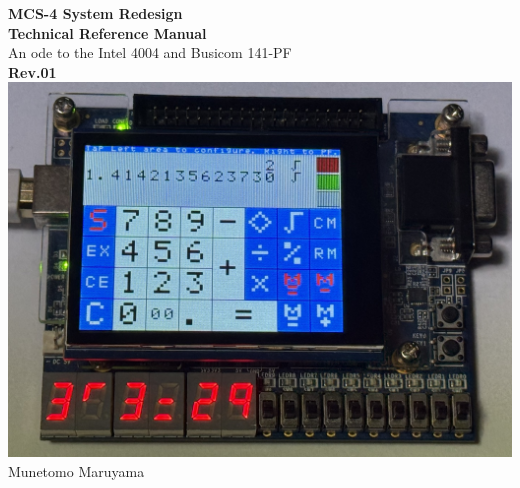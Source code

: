 \begin{titlepage}
    \begin{center}
        \vspace*{3cm}
        {\Huge \textbf{MCS-4 System Redesign}}\\[1cm]
        {\Huge \textbf{Technical Reference Manual}}\\[2cm]
        {\Large{An ode to the Intel 4004 and Busicom 141-PF}}\\[2cm]
        {\LARGE \textbf{Rev.01}}\\[5cm]
        \includegraphics[width=0.5\columnwidth]{./Figure/141PFonFPGA.jpg}\\[2cm]
        {\LARGE{Munetomo Maruyama}}\\[0.5cm]
    \end{center} 
\end{titlepage}
